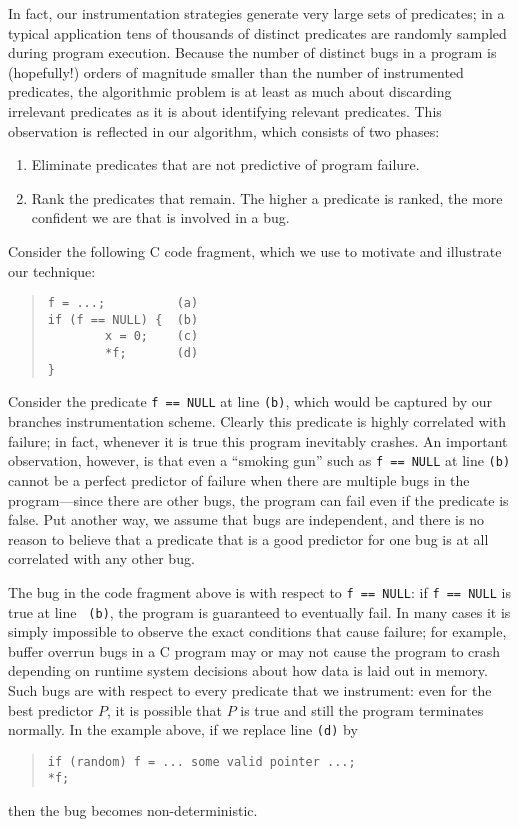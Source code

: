 In fact, our instrumentation strategies generate very large sets
of predicates; in a typical application tens of thousands of distinct
predicates are randomly sampled during program execution.  Because the
number of distinct bugs in a program is (hopefully!) orders of
magnitude smaller than the number of instrumented predicates, the
algorithmic problem is at least as much about discarding irrelevant
predicates as it is about identifying relevant predicates.  This
observation is reflected in our algorithm, which consists of two phases:
\begin{enumerate}
\item Eliminate predicates that are not predictive of program failure.

\item Rank the predicates that remain.  The higher a predicate is ranked,
the more confident we are that is involved in a bug.
\end{enumerate}

Consider the following C code fragment, which we use to motivate and illustrate
our technique:
\begin{quote}
\begin{verbatim}
f = ...;          (a)
if (f == NULL) {  (b)
        x = 0;    (c)
        *f;       (d)
}
\end{verbatim}
\end{quote}
Consider the predicate {\tt f == NULL} at line {\tt (b)}, which would
be captured by our branches instrumentation scheme.  Clearly
this predicate is highly correlated with failure; in fact, whenever it
is true this program inevitably crashes.  An important observation,
however, is that even a ``smoking gun'' such as {\tt f == NULL} at
line {\tt (b)} cannot be a perfect predictor of failure when there are
multiple bugs in the program---since there are other bugs, the program can fail
even if the predicate is false.  Put another way, we assume
that bugs are independent, and there is no reason to believe that
a predicate that is a good predictor for one bug is at all correlated
with any other bug.

The bug in the code fragment above is  with
respect to {\tt f == NULL}: if {\tt f == NULL} is true at line {\tt
(b)}, the program is guaranteed to eventually fail.  In many cases it
is simply impossible to observe the exact conditions that cause
failure; for example, buffer overrun bugs in a C program may or may
not cause the program to crash depending on runtime system decisions
about how data is laid out in memory.  Such bugs are
 with respect to every predicate that we instrument:
even for the best predictor $P$, it is possible that $P$ is true and
still the program terminates normally.  In the example above, if we replace line
{\tt (d)} by
\begin{quote}
\begin{verbatim}
if (random) f = ... some valid pointer ...;
*f;
\end{verbatim}
\end{quote}
then the bug becomes non-deterministic.

